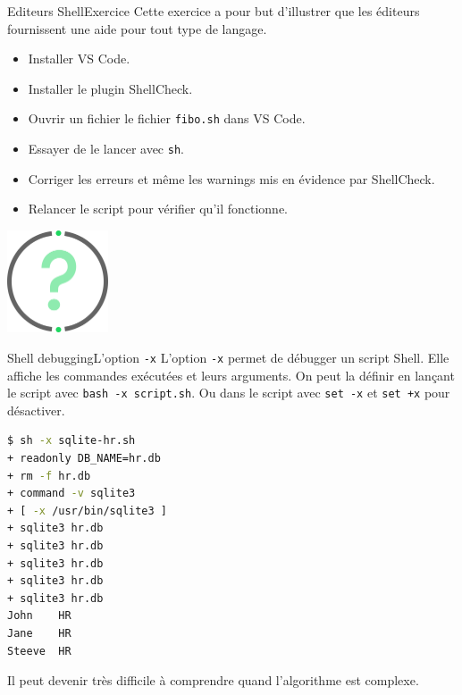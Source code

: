 \documentclass{beamer}
\begin{document}
    \begin{frame}{Editeurs Shell}{Exercice \execcounterdispinc}
        Cette exercice a pour but d'illustrer que les éditeurs fournissent une aide pour tout type de langage.
        \begin{itemize}
            \item Installer VS Code.
            \item Installer le plugin ShellCheck.
            \item Ouvrir un fichier le fichier \lstinline{fibo.sh} dans VS Code.
            \item Essayer de le lancer avec \lstinline{sh}.
            \item Corriger les erreurs et même les warnings mis en évidence par ShellCheck.
            \item Relancer le script pour vérifier qu'il fonctionne.
        \end{itemize}
        \bigbreak
        \centering
        \includegraphics[width=3cm]{image/question-mark}
    \end{frame}

    \begin{frame}[fragile]{Shell debugging}{L'option \lstinline{-x}}
        L'option \lstinline{-x} permet de débugger un script Shell.
        Elle affiche les commandes exécutées et leurs arguments.
        On peut la définir en lançant le script avec \lstinline{bash -x script.sh}.
        Ou dans le script avec \lstinline{set -x} et \lstinline{set +x} pour désactiver.
        \bigbreak
        \begin{lstlisting}[language=bash,basicstyle=\tiny\ttfamily]
$ sh -x sqlite-hr.sh
+ readonly DB_NAME=hr.db
+ rm -f hr.db
+ command -v sqlite3
+ [ -x /usr/bin/sqlite3 ]
+ sqlite3 hr.db
+ sqlite3 hr.db
+ sqlite3 hr.db
+ sqlite3 hr.db
+ sqlite3 hr.db
John    HR
Jane    HR
Steeve  HR
        \end{lstlisting}
        \bigbreak
        Il peut devenir très difficile à comprendre quand l'algorithme est complexe.
    \end{frame}
\end{document}
